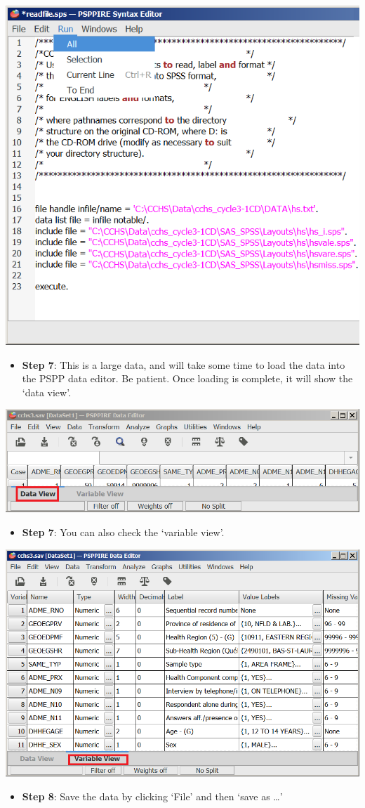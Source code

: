 \documentclass[
]{book}
\providecommand{\tightlist}{%
  \setlength{\itemsep}{0pt}\setlength{\parskip}{0pt}}
\begin{document}
\includegraphics[width=0.65\linewidth]{images/abacus35}

\begin{itemize}
\tightlist
\item
  \textbf{Step 7}: This is a large data, and will take some time to load the data into the PSPP data editor. Be patient. Once loading is complete, it will show the `data view'.
\end{itemize}

\includegraphics[width=0.65\linewidth]{images/abacus36}

\begin{itemize}
\tightlist
\item
  \textbf{Step 7}: You can also check the `variable view'.
\end{itemize}

\includegraphics[width=0.65\linewidth]{images/abacus37}

\begin{itemize}
\tightlist
\item
  \textbf{Step 8}: Save the data by clicking `File' and then `save as \ldots{}'
\end{itemize}
\end{document}

